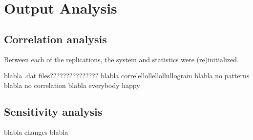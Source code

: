 \section{Output Analysis}
\subsection{Correlation analysis}
Between each of the replications, the system and statistics were (re)initialized.

blabla .dat files??????????????? blabla correlellollellollullogram blabla no patterns blabla no correlation blabla everybody happy


\subsection{Sensitivity analysis}
blabla changes blabla